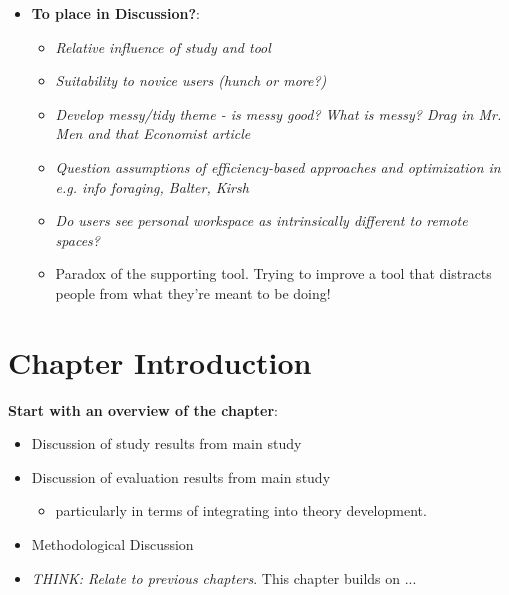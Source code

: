 \begin{itemize}
	\item \textbf{To place in Discussion?}:
	\begin{itemize}
		\item \textit{Relative influence of study and tool}
		\item \textit{Suitability to novice users (hunch or more?)}
		\item \textit{Develop messy/tidy theme - is messy good?  What is messy? Drag in Mr. Men and that Economist article}
		\item \textit{Question assumptions of efficiency-based approaches and optimization in e.g. info foraging, Balter, Kirsh}
		\item \textit{Do users see personal workspace as intrinsically different to remote spaces?}
		\item Paradox of the supporting tool.  Trying to improve a tool that distracts people from what they're meant to be doing!
	\end{itemize}

\end{itemize}



\section{Chapter Introduction}
\label{ch7:discussion-introduction}

\textbf{Start with an overview of the chapter}:
\begin{itemize}
		
		\item Discussion of study results from main study
		
		\item Discussion of evaluation results from main study
		\begin{itemize}
				\item particularly in terms of integrating into theory development.
		\end{itemize}
		
		\item Methodological Discussion
		
		\item \textit{THINK: Relate to previous chapters}. This chapter builds on ...

\end{itemize}
	


